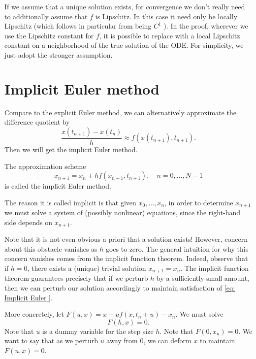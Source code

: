 \begin{remark}
 If we assume that a unique solution exists, for convergence we don't really need to additionally assume that $f$ is Lipschitz. In this case it need only be locally Lipschitz (which follows in particular from being $C^1$ ). In the proof, wherever we use the Lipschitz constant for $f$, it is possible to replace with a local Lipschitz constant on a neighborhood of the true solution of the ODE. For simplicity, we just adopt the stronger assumption.
\end{remark}

\section{Implicit Euler method}
Compare to the explicit Euler method, we can alternatively approximate the difference quotient by 
\[
    \frac{x\left(t_{n+1}\right)-x\left(t_n\right)}{h} \approx f\left(x\left(t_{n+1}\right), t_{n+1}\right) . 
\]
Then we will get the implicit Euler method. 

\begin{definition}
\label{def: Implicit Euler}
The approximation scheme 
\begin{equation}
\label{eq: Implicit Euler }
x_{n+1}=x_n+h f\left(x_{n+1}, t_{n+1}\right), \quad n=0, \ldots, N-1
\end{equation}
is called the implicit Euler method. 
\end{definition}

 The reason it is called implicit is that given $x_0, \ldots, x_n$, in order to determine $x_{n+1}$ we must solve a system of (possibly nonlinear) equations, since the right-hand side depends on $x_{n+1}$.

 Note that it is not even obvious a priori that a solution exists! However, concern about this obstacle vanishes as $h$ goes to zero. The general intuition for why this concern vanishes comes from the implicit function theorem. Indeed, observe that if $h=0$, there exists a (unique) trivial solution $x_{n+1}=x_n$. The implicit function theorem guarantees precisely that if we perturb $h$ by a sufficiently small amount, then we can perturb our solution accordingly to maintain satisfaction of \eqref{eq: Implicit Euler }. 

 More concretely, let $ F(u,x) = x - uf(x,t_n+u) -x_n $. We must solve 
 \begin{equation}
 \label{eq: implicit function Euler}
    F(h,x) = 0.
 \end{equation}
 Note that $ u $ is a dummy variable for the step size $ h $. Note that $ F(0,x_n)=0 $. We want to say that as we perturb $ u $ away from $ 0 $, we can deform $ x $ to maintain $ F(u,x)=0 $. 

